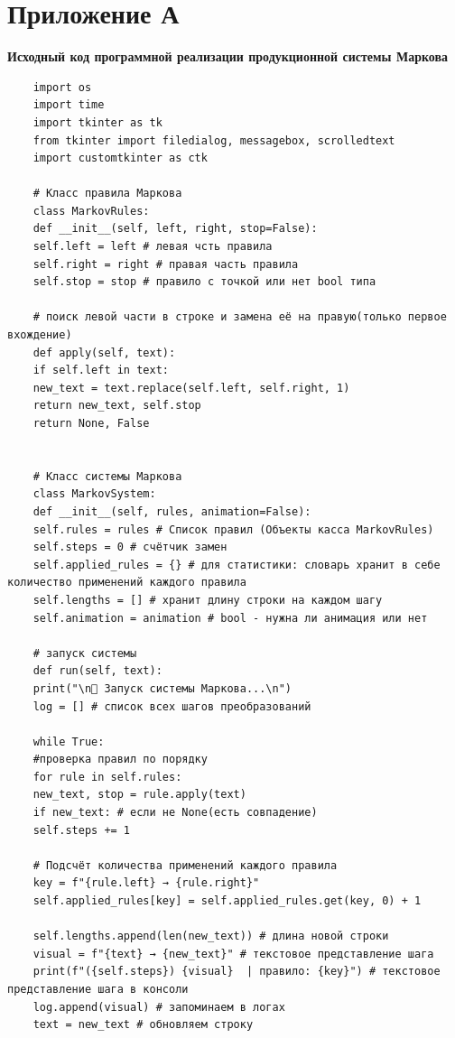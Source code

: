 \section*{Приложение А}

\begin{center}
	\Large\textbf{Исходный код программной реализации продукционной системы Маркова}
\end{center}


\begin{lstlisting}
	import os
	import time
	import tkinter as tk
	from tkinter import filedialog, messagebox, scrolledtext
	import customtkinter as ctk
	
	# Класс правила Маркова
	class MarkovRules:
	def __init__(self, left, right, stop=False):
	self.left = left # левая чсть правила
	self.right = right # правая часть правила
	self.stop = stop # правило с точкой или нет bool типа
	
	# поиск левой части в строке и замена её на правую(только первое вхождение)
	def apply(self, text):
	if self.left in text:
	new_text = text.replace(self.left, self.right, 1)
	return new_text, self.stop
	return None, False
	
	
	# Класс системы Маркова
	class MarkovSystem:
	def __init__(self, rules, animation=False):
	self.rules = rules # Список правил (Объекты касса MarkovRules)
	self.steps = 0 # счётчик замен
	self.applied_rules = {} # для статистики: словарь хранит в себе количество применений каждого правила
	self.lengths = [] # хранит длину строки на каждом шагу
	self.animation = animation # bool - нужна ли анимация или нет
	
	# запуск системы
	def run(self, text):
	print("\n🔹 Запуск системы Маркова...\n")
	log = [] # список всех шагов преобразований
	
	while True:
	#проверка правил по порядку
	for rule in self.rules:
	new_text, stop = rule.apply(text)
	if new_text: # если не None(есть совпадение)
	self.steps += 1
	
	# Подсчёт количества применений каждого правила
	key = f"{rule.left} → {rule.right}"
	self.applied_rules[key] = self.applied_rules.get(key, 0) + 1 
	
	self.lengths.append(len(new_text)) # длина новой строки
	visual = f"{text} → {new_text}" # текстовое представление шага
	print(f"({self.steps}) {visual}  | правило: {key}") # текстовое представление шага в консоли
	log.append(visual) # запоминаем в логах
	text = new_text # обновляем строку
	

\end{lstlisting}
